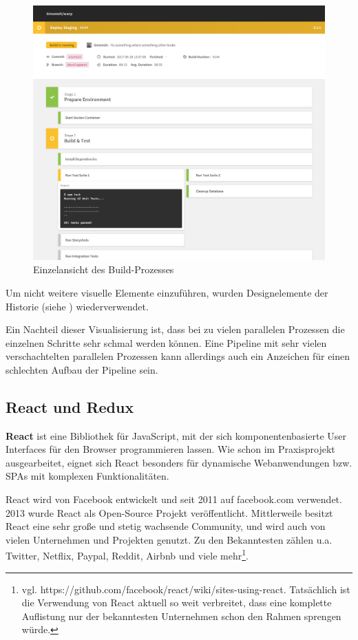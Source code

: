 \begin{figure}[h]
  \caption{Einzelansicht des Build-Prozesses}
  \label{fig:pipeline-overview}
  \centering
    \includegraphics[width=\textwidth]{assets/pipeline-overview}
\end{figure}

Um nicht weitere visuelle Elemente einzuführen, wurden Designelemente der Historie (siehe ) wiederverwendet.

Ein Nachteil dieser Visualisierung ist, dass bei zu vielen parallelen Prozessen die einzelnen Schritte sehr schmal werden können. Eine Pipeline mit sehr vielen verschachtelten parallelen Prozessen kann allerdings auch ein Anzeichen für einen schlechten Aufbau der Pipeline sein.

\subsection{React und Redux}
\label{subsec:react-redux}

\textbf{React} ist eine Bibliothek für JavaScript, mit der sich komponentenbasierte User Interfaces für den Browser programmieren lassen. Wie schon im Praxisprojekt \citep{Maemecke2017} ausgearbeitet, eignet sich React besonders für dynamische Web\-anwendungen bzw. \acp{SPA} mit komplexen Funktionalitäten.

React wird von Facebook entwickelt und seit 2011 auf facebook.com verwendet. 2013 wurde React als Open-Source Projekt veröffentlicht. Mittlerweile besitzt React eine sehr große und stetig wachsende Community, und wird auch von vielen Unternehmen und Projekten genutzt. Zu den Bekanntesten zählen u.a. Twitter, Netflix, Paypal, Reddit, Airbnb und viele mehr\footnote{vgl. https://github.com/facebook/react/wiki/sites-using-react. Tatsächlich ist die Verwendung von React aktuell so weit verbreitet, dass eine komplette Auflistung nur der bekanntesten Unternehmen schon den Rahmen sprengen würde.}.

